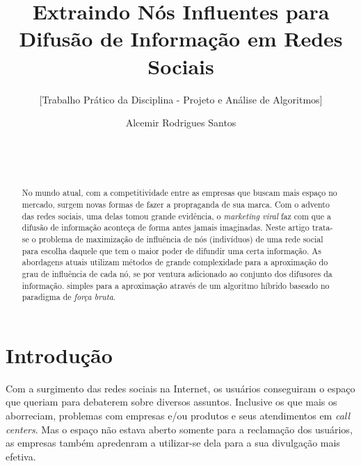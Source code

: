 \documentclass{acm_proc_article-sp}
\title{Extraindo Nós Influentes para Difusão de Informação em Redes Sociais}
\subtitle{[Trabalho Prático da Disciplina - Projeto e Análise de Algoritmos]}
\author{
  \alignauthor 
  Alcemir Rodrigues Santos \\
  \affaddr{Universidade de Minas Gerais - UFMG}\\
  \affaddr{Instituto de Ciências Exatas - ICEx}\\
  \affaddr{Minas Gerais - Belo Horizonte - Campus Pampulha - CEP 31270-010} \\
  \email{alcemir@dcc.ufmg.br}}
\begin{document}
\maketitle
\begin{abstract}
No mundo atual, com a competitividade entre as empresas que buscam mais espaço no mercado, surgem novas formas de
fazer a propraganda de sua marca. Com o advento das redes sociais, uma delas tomou grande evidência, o
\textit{marketing viral} faz com que a difusão de informação aconteça de forma antes jamais imaginadas. 
Neste artigo trata-se o problema de maximização de influência de nós (indivíduos) de uma rede social para escolha
daquele que tem o maior poder de difundir uma certa informação. %
As abordagens atuais utilizam métodos de grande complexidade para a aproximação do grau de influência de cada nó, 
se por ventura adicionado ao conjunto dos difusores da informação.%
simples para a aproximação através de um algoritmo híbrido baseado no paradigma de \textit{força bruta}.

\end{abstract}



\newtheorem{definicao}{Definição}
\section{Introdução}
Com a surgimento das redes sociais na Internet, os usuários conseguiram o espaço que queriam para debaterem sobre diversos assuntos.
Inclusive os que mais os aborreciam, problemas com empresas e/ou produtos e seus atendimentos em \textit{call centers}.
Mas o espaço não estava aberto somente para a reclamação dos usuários, as empresas também apredenram a utilizar-se dela para a sua 
divulgação mais efetiva. 
\end{document}

